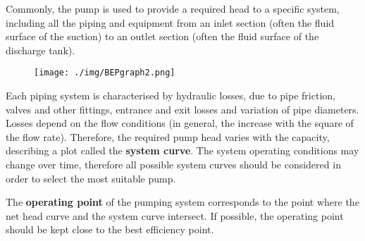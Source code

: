 Commonly, the pump is used  to provide a required head to a specific system, including all the piping and equipment from an inlet section (often the fluid surface of the suction) to an outlet section (often the fluid surface of the discharge tank).
\begin{figure}[H]
  \centering
  \texttt{[image: ./img/BEPgraph2.png]}
\end{figure}
Each piping system is characterised by hydraulic losses, due to pipe friction, valves and other fittings, entrance and exit losses and variation of pipe diameters. Losses depend on the flow conditions (in general, the increase with the square of the flow rate). Therefore, the required pump head varies with the capacity, describing a plot called the \textbf{system curve}. The system operating conditions may change over time, therefore all possible system curves should be considered in order to select the most suitable pump.

The \textbf{operating point} of the pumping system corresponds to the point where the net head curve and the system curve intersect. If possible, the operating point should be kept close to the best efficiency point.
